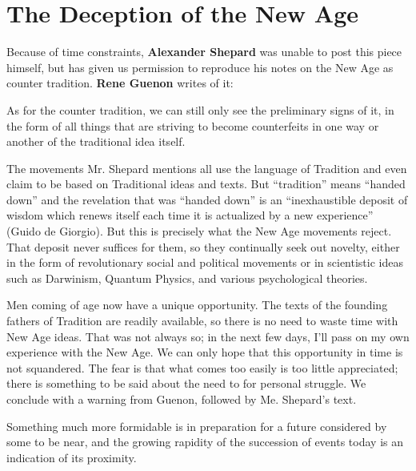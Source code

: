 \section{The Deception of the New Age}

\begin{quotex}
Because of time constraints, \textbf{Alexander Shepard} was unable to post this piece himself, but has given us permission to reproduce his notes on the New Age as counter tradition. \textbf{Rene Guenon} writes of it:

\begin{quotex}

As for the counter tradition, we can still only see the preliminary signs of it, in the form of all things that are striving to become counterfeits in one way or another of the traditional idea itself.
\end{quotex}


The movements Mr. Shepard mentions all use the language of Tradition and even claim to be based on Traditional ideas and texts. But ``tradition'' means ``handed down'' and the revelation that was ``handed down'' is an ``inexhaustible deposit of wisdom which renews itself each time it is actualized by a new experience'' (Guido de Giorgio). But this is precisely what the New Age movements reject. That deposit never suffices for them, so they continually seek out novelty, either in the form of revolutionary social and political movements or in scientistic ideas such as Darwinism, Quantum Physics, and various psychological theories.

Men coming of age now have a unique opportunity. The texts of the founding fathers of Tradition are readily available, so there is no need to waste time with New Age ideas. That was not always so; in the next few days, I'll pass on my own experience with the New Age. We can only hope that this opportunity in time is not squandered. The fear is that what comes too easily is too little appreciated; there is something to be said about the need to for personal struggle. We conclude with a warning from Guenon, followed by Me. Shepard's text.

\begin{quotex}
Something much more formidable is in preparation for a future considered by some to be near, and the growing rapidity of the succession of events today is an indication of its proximity.
\end{quotex}

\end{quotex}


